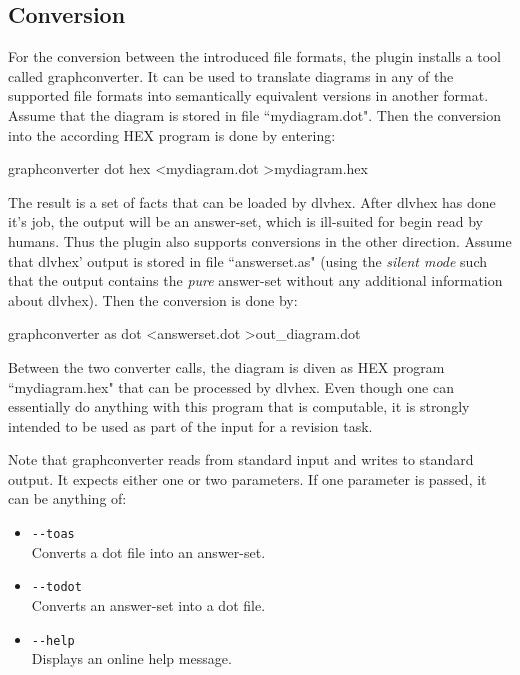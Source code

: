 \documentclass[a4paper,11pt]{article}
\theoremstyle{definition}
\newcommand{\hex}{\textsf{HEX}\xspace }
\newcommand{\dlvhex}{\textsf{dlvhex}\xspace }
\newcommand{\dotff}{\textsf{dot}\xspace }
\newcommand{\inlinecode}[1]{\textsf{#1}\xspace }
\begin{document}
		\subsection{Conversion}
		\label{sec:Conversion:Converstion}

			For the conversion between the introduced file formats, the plugin installs a tool called \inlinecode{graphconverter}.
			It can be used to translate diagrams in any of the supported file formats into semantically equivalent versions in another format.
			Assume that the diagram is stored in file ``mydiagram.dot". Then the conversion into the according \hex program is done by entering:
			\begin{center}
				\inlinecode{graphconverter dot hex \textless mydiagram.dot \textgreater mydiagram.hex}
			\end{center}

			The result is a set of facts that can be loaded by \dlvhex. After \dlvhex has done it's job, the output will be an answer-set, which is ill-suited for begin read by humans. Thus the plugin
			also supports conversions in the other direction. Assume that \dlvhex' output is stored in file ``answerset.as" (using the \emph{silent mode} such that the output contains
			the \emph{pure} answer-set without any additional information about \dlvhex). Then the conversion is done by:
			\begin{center}
				\inlinecode{graphconverter as dot \textless answerset.dot \textgreater out\_diagram.dot}
			\end{center}

			Between the two converter calls, the diagram is diven as \hex program ``mydiagram.hex" that can be processed by \dlvhex. Even though one can essentially do anything
			with this program that is computable, it is strongly intended to be used as part of the input for a revision task.

			Note that \inlinecode{graphconverter} reads from standard input and writes to standard output.
			It expects either one or two parameters. If one parameter is passed, it can be anything of:
			\begin{itemize}
				\item \verb+--toas+ \\
					Converts a \dotff file into an answer-set.
				\item \verb+--todot+ \\
					Converts an answer-set into a \dotff file.
				\item \verb+--help+ \\
					Displays an online help message.
			\end{itemize}
\end{document}
